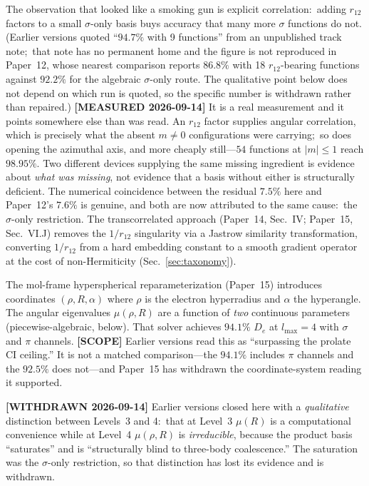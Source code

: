 \documentclass[aps,pra,twocolumn,superscriptaddress,longbibliography]{revtex4-2}
\begin{document}
The observation that looked like a smoking gun is explicit correlation:\
adding $r_{12}$ factors to a small $\sigma$-only basis buys accuracy that
many more $\sigma$ functions do not.  (Earlier versions quoted
``$94.7\%$ with 9 functions'' from an unpublished track note;\ that note
has no permanent home and the figure is not reproduced in Paper~12, whose
nearest comparison reports $86.8\%$ with 18 $r_{12}$-bearing functions
against $92.2\%$ for the algebraic $\sigma$-only route.  The qualitative
point below does not depend on which run is quoted, so the specific
number is withdrawn rather than repaired.)
\textbf{[MEASURED 2026-09-14]} It is a real measurement and it points
somewhere else than was read.  An $r_{12}$ factor supplies angular
correlation, which is precisely what the absent $m \neq 0$ configurations
were carrying;\ so does opening the azimuthal axis, and more cheaply
still---$54$ functions at $|m| \le 1$ reach $98.95\%$.  Two different
devices supplying the same missing ingredient is evidence about
\emph{what was missing}, not evidence that a basis without either is
structurally deficient.  The numerical coincidence between the residual
$7.5\%$ here and Paper~12's $7.6\%$ is genuine, and both are now
attributed to the same cause:\ the $\sigma$-only restriction.
The transcorrelated approach (Paper~14, Sec.~IV; Paper~15,
Sec.~VI.J) removes the $1/r_{12}$ singularity via a Jastrow similarity
transformation, converting $1/r_{12}$ from a hard embedding
constant to a smooth gradient operator at the cost of
non-Hermiticity (Sec.~\ref{sec:taxonomy}).

The mol-frame hyperspherical reparameterization (Paper~15) introduces
coordinates $(\rho, R, \alpha)$ where $\rho$ is the electron hyperradius
and $\alpha$ the hyperangle.  The angular eigenvalues $\mu(\rho, R)$ are
a function of \emph{two} continuous parameters (piecewise-algebraic,
below).  That
solver achieves $94.1\%$ $D_e$ at $l_{\max} = 4$ with $\sigma$ and $\pi$
channels.  \textbf{[SCOPE]} Earlier versions read this as ``surpassing the
prolate CI ceiling.''  It is not a matched comparison---the $94.1\%$
includes $\pi$ channels and the $92.5\%$ does not---and Paper~15 has
withdrawn the coordinate-system reading it supported.

\textbf{[WITHDRAWN 2026-09-14]} Earlier versions closed here with a
\emph{qualitative} distinction between Levels~3 and 4:\ that at Level~3
$\mu(R)$ is a computational convenience while at Level~4 $\mu(\rho,R)$ is
\emph{irreducible}, because the product basis ``saturates'' and is
``structurally blind to three-body coalescence.''  The saturation was the
$\sigma$-only restriction, so that distinction has lost its evidence and
is withdrawn.
\end{document}
